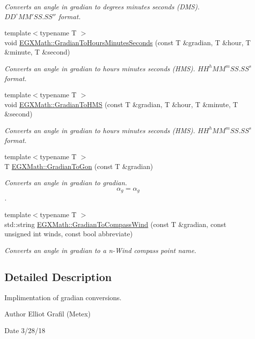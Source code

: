 \begin{DoxyCompactItemize}
\begin{DoxyCompactList}\small\item\em Converts an angle in gradian to degrees minutes seconds (D\+MS). ${DD}^{\circ}{MM}'{SS.SS}''$ format. \end{DoxyCompactList}\item 
{\footnotesize template$<$typename T $>$ }\\void \mbox{\hyperlink{group___e_g_x_math-_angle_conversions-_gradian_gaf174cf5b716d5a490b3744ffe9ff3b97}{E\+G\+X\+Math\+::\+Gradian\+To\+Hours\+Minutes\+Seconds}} (const T \&gradian, T \&hour, T \&minute, T \&second)
\begin{DoxyCompactList}\small\item\em Converts an angle in gradian to hours minutes seconds (H\+MS). ${HH}^h{MM}^m{SS.SS}^s$ format. \end{DoxyCompactList}\item 
{\footnotesize template$<$typename T $>$ }\\void \mbox{\hyperlink{group___e_g_x_math-_angle_conversions-_gradian_ga6513a992679fbb97d2969cf8bd68306f}{E\+G\+X\+Math\+::\+Gradian\+To\+H\+MS}} (const T \&gradian, T \&hour, T \&minute, T \&second)
\begin{DoxyCompactList}\small\item\em Converts an angle in gradian to hours minutes seconds (H\+MS). ${HH}^h{MM}^m{SS.SS}^s$ format. \end{DoxyCompactList}\item 
{\footnotesize template$<$typename T $>$ }\\T \mbox{\hyperlink{group___e_g_x_math-_angle_conversions-_gradian_gaff399262b6c8455e450e0a9dc8eb2ad1}{E\+G\+X\+Math\+::\+Gradian\+To\+Gon}} (const T \&gradian)
\begin{DoxyCompactList}\small\item\em Converts an angle in gradian to gradian. \[\alpha_{g}=\alpha_{g}\]. \end{DoxyCompactList}\item 
{\footnotesize template$<$typename T $>$ }\\std\+::string \mbox{\hyperlink{group___e_g_x_math-_angle_conversions-_gradian_ga52ed2e44217e6a57e56829bee36612dc}{E\+G\+X\+Math\+::\+Gradian\+To\+Compass\+Wind}} (const T \&gradian, const unsigned int winds, const bool abbreviate)
\begin{DoxyCompactList}\small\item\em Converts an angle in gradian to a n-\/\+Wind compass point name. \end{DoxyCompactList}\end{DoxyCompactItemize}


\subsection{Detailed Description}
Implimentation of gradian conversions. 

\begin{DoxyAuthor}{Author}
Elliot Grafil (Metex) 
\end{DoxyAuthor}
\begin{DoxyDate}{Date}
3/28/18 
\end{DoxyDate}
